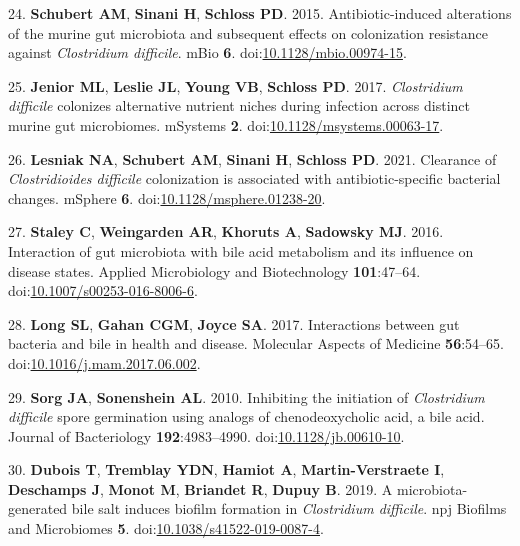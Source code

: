 \documentclass[
  12pt,
]{article}
\newenvironment{cslreferences}%
  {}%
  {\par}
\begin{document}
\begin{cslreferences}
\leavevmode\hypertarget{ref-Schubert2015}{}%
24. \textbf{Schubert AM}, \textbf{Sinani H}, \textbf{Schloss PD}. 2015.
Antibiotic-induced alterations of the murine gut microbiota and
subsequent effects on colonization resistance against \emph{Clostridium
difficile}. mBio \textbf{6}.
doi:\href{https://doi.org/10.1128/mbio.00974-15}{10.1128/mbio.00974-15}.

\leavevmode\hypertarget{ref-Jenior2017}{}%
25. \textbf{Jenior ML}, \textbf{Leslie JL}, \textbf{Young VB},
\textbf{Schloss PD}. 2017. \emph{Clostridium difficile} colonizes
alternative nutrient niches during infection across distinct murine gut
microbiomes. mSystems \textbf{2}.
doi:\href{https://doi.org/10.1128/msystems.00063-17}{10.1128/msystems.00063-17}.

\leavevmode\hypertarget{ref-Lesniak2021}{}%
26. \textbf{Lesniak NA}, \textbf{Schubert AM}, \textbf{Sinani H},
\textbf{Schloss PD}. 2021. Clearance of \emph{Clostridioides difficile}
colonization is associated with antibiotic-specific bacterial changes.
mSphere \textbf{6}.
doi:\href{https://doi.org/10.1128/msphere.01238-20}{10.1128/msphere.01238-20}.

\leavevmode\hypertarget{ref-Staley2016}{}%
27. \textbf{Staley C}, \textbf{Weingarden AR}, \textbf{Khoruts A},
\textbf{Sadowsky MJ}. 2016. Interaction of gut microbiota with bile acid
metabolism and its influence on disease states. Applied Microbiology and
Biotechnology \textbf{101}:47--64.
doi:\href{https://doi.org/10.1007/s00253-016-8006-6}{10.1007/s00253-016-8006-6}.

\leavevmode\hypertarget{ref-Long2017}{}%
28. \textbf{Long SL}, \textbf{Gahan CGM}, \textbf{Joyce SA}. 2017.
Interactions between gut bacteria and bile in health and disease.
Molecular Aspects of Medicine \textbf{56}:54--65.
doi:\href{https://doi.org/10.1016/j.mam.2017.06.002}{10.1016/j.mam.2017.06.002}.

\leavevmode\hypertarget{ref-Sorg2010}{}%
29. \textbf{Sorg JA}, \textbf{Sonenshein AL}. 2010. Inhibiting the
initiation of \emph{Clostridium difficile} spore germination using
analogs of chenodeoxycholic acid, a bile acid. Journal of Bacteriology
\textbf{192}:4983--4990.
doi:\href{https://doi.org/10.1128/jb.00610-10}{10.1128/jb.00610-10}.

\leavevmode\hypertarget{ref-Dubois2019}{}%
30. \textbf{Dubois T}, \textbf{Tremblay YDN}, \textbf{Hamiot A},
\textbf{Martin-Verstraete I}, \textbf{Deschamps J}, \textbf{Monot M},
\textbf{Briandet R}, \textbf{Dupuy B}. 2019. A microbiota-generated bile
salt induces biofilm formation in \emph{Clostridium difficile}. npj
Biofilms and Microbiomes \textbf{5}.
doi:\href{https://doi.org/10.1038/s41522-019-0087-4}{10.1038/s41522-019-0087-4}.


\end{cslreferences}
\end{document}
